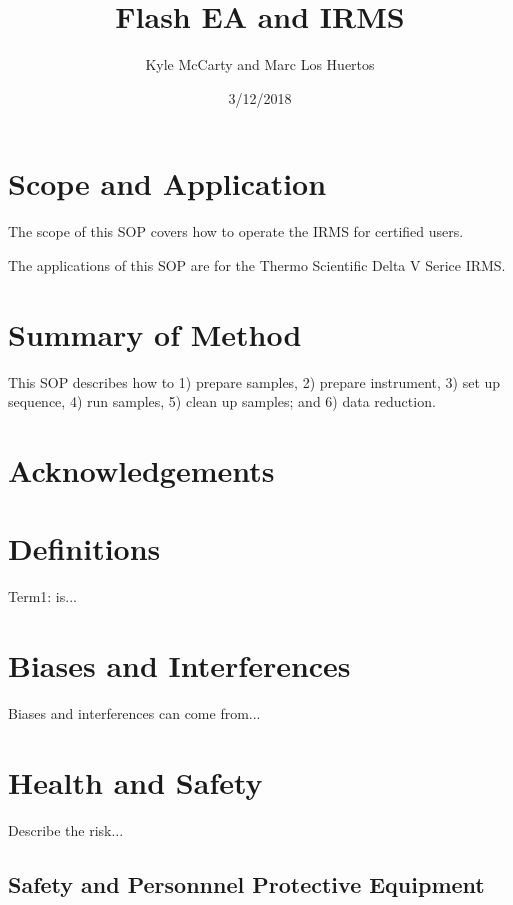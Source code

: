 \documentclass[12pt]{../SOP3}\usepackage[]{graphicx}\usepackage[]{color}
\title{Flash EA and IRMS}
\date{3/12/2018}
\author{Kyle McCarty and Marc Los Huertos}
\begin{document}
\maketitle

\section{Scope and Application}

\NP The scope of this SOP covers how to operate the IRMS for certified users.

\NP The applications of this SOP are for the Thermo Scientific Delta V Serice IRMS. 

\section{Summary of Method}

\NP This SOP describes how to 1) prepare samples, 2) prepare instrument, 3) set up sequence, 4) run samples, 5) clean up samples; and 6) data reduction. 

\tableofcontents

\newpage

\section{Acknowledgements}

\section{Definitions}

\NP Term1: is...

\section{Biases and Interferences}

\NP Biases and interferences can come from...

\section{Health and Safety}

\NP Describe the risk...


\subsection{Safety and Personnnel Protective Equipment}
\end{document}
